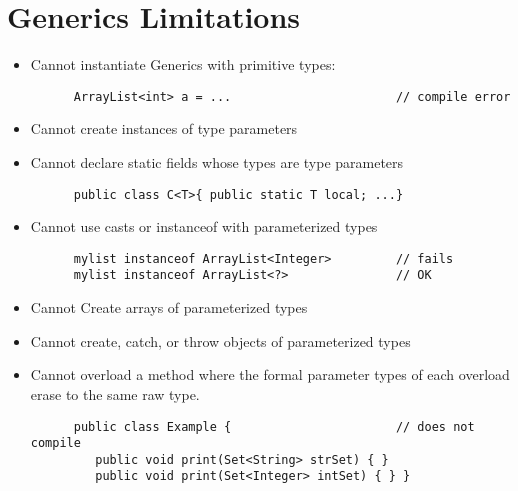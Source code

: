 \section{Generics Limitations}
\begin{itemize}
   \item Cannot instantiate Generics with primitive types:
   \begin{lstlisting}
      ArrayList<int> a = ...                       // compile error
   \end{lstlisting}
   \item Cannot create instances of type parameters
   \item Cannot declare static fields whose types are type parameters
   \begin{lstlisting}
      public class C<T>{ public static T local; ...}
   \end{lstlisting}
   \item Cannot use casts or instanceof with parameterized types
   \begin{lstlisting}
      mylist instanceof ArrayList<Integer>         // fails
      mylist instanceof ArrayList<?>               // OK
   \end{lstlisting}
   \item Cannot Create arrays of parameterized types
   \item Cannot create, catch, or throw objects of parameterized types
   \item Cannot overload a method where the formal parameter types of each overload erase to the same raw type.
   \begin{lstlisting}
      public class Example {                       // does not compile
         public void print(Set<String> strSet) { }
         public void print(Set<Integer> intSet) { } }
   \end{lstlisting}
\end{itemize}

